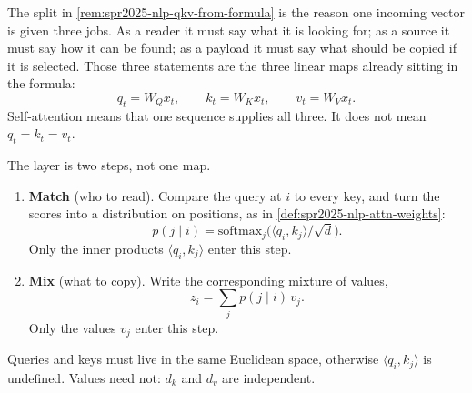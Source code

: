\documentclass[11pt,a4paper]{article}
\theoremstyle{definition}
\begin{document}
\begin{remark}
\label{rem:spr2025-nlp-qkv}
The split in \cref{rem:spr2025-nlp-qkv-from-formula} is the reason one incoming vector is given three jobs. As a reader it must say what it is looking for; as a source it must say how it can be found; as a payload it must say what should be copied if it is selected. Those three statements are the three linear maps already sitting in the formula:
\[
q_t=W_Q x_t,\qquad
k_t=W_K x_t,\qquad
v_t=W_V x_t.
\]
Self-attention means that one sequence supplies all three. It does not mean \(q_t=k_t=v_t\).

The layer is two steps, not one map.
\begin{enumerate}[leftmargin=1.4em,itemsep=0.25em]
  \item \textbf{Match} (who to read). Compare the query at \(i\) to every key, and turn the scores into a distribution on positions, as in \cref{def:spr2025-nlp-attn-weights}:
  \[
  p(j\mid i)
  =\mathrm{softmax}_j\bigl(\langle q_i,k_j\rangle/\sqrt{d}\bigr).
  \]
  Only the inner products \(\langle q_i,k_j\rangle\) enter this step.
  \item \textbf{Mix} (what to copy). Write the corresponding mixture of values,
  \[
  z_i=\sum_j p(j\mid i)\,v_j.
  \]
  Only the values \(v_j\) enter this step.
\end{enumerate}
Queries and keys must live in the same Euclidean space, otherwise \(\langle q_i,k_j\rangle\) is undefined. Values need not: \(d_k\) and \(d_v\) are independent.

\begin{center}
\end{center}
\end{remark}
\end{document}
